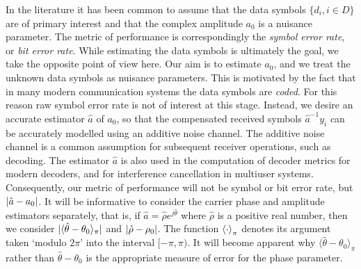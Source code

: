 \documentclass[draftcls, onecolumn, 11pt]{IEEEtran}
\begin{document}
In the literature it has been common to assume that the data symbols $\{d_i, i \in D\}$ are of primary interest and that the complex amplitude $a_0$ is a nuisance parameter.  The metric of performance is correspondingly the \emph{symbol error rate}, or \emph{bit error rate}.  While estimating the data symbols is ultimately the goal, we take the opposite point of view here.  Our aim is to estimate $a_0$, and we treat the unknown data symbols as nuisance parameters.  This is motivated by the fact that in many modern communication systems the data symbols are \emph{coded}.  For this reason raw symbol error rate is not of interest at this stage.  Instead, we desire an accurate estimator $\hat{a}$ of $a_0$, so that the compensated received symbols $\hat{a}^{-1}y_i$ can be accurately modelled using an additive noise channel.  The additive noise channel is a common assumption for subsequent receiver operations, such as decoding.  The estimator $\hat{a}$ is also used in the computation of decoder metrics for modern decoders, and for interference cancellation in multiuser systems.  Consequently, our metric of performance will not be symbol or bit error rate, but ${\vert \hat{a} - a_0 \vert}$. It will be informative to consider the carrier phase and amplitude estimators separately, that is, if $\hat{a} = \hat{\rho}e^{j\hat{\theta}}$ where $\hat{\rho}$ is a positive real number, then we consider ${\vert \langle\hat{\theta} - \theta_0\rangle_\pi \vert}$ and ${\vert \hat{\rho} - \rho_0 \vert}$.  The function $\left\langle \cdot \right\rangle_\pi$ denotes its argument taken `modulo $2\pi$' into the interval $[-\pi, \pi)$.  It will become apparent why $\langle\hat{\theta} - \theta_0\rangle_\pi$ rather than $\hat{\theta} - \theta_0$ is the appropriate measure of error for the phase parameter.

\end{document}
